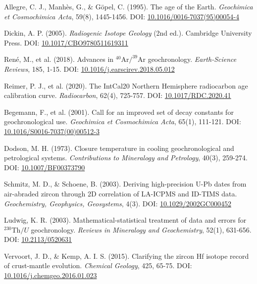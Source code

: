 \documentclass{article}
\begin{document}
\begin{thebibliography}{9}
Allegre, C. J., Manhès, G., \& Göpel, C. (1995). The age of the Earth. \textit{Geochimica et Cosmochimica Acta}, 59(8), 1445-1456. 
DOI: \href{https://doi.org/10.1016/0016-7037(95)00054-4}{10.1016/0016-7037(95)00054-4}

Dickin, A. P. (2005). \textit{Radiogenic Isotope Geology} (2nd ed.). Cambridge University Press. 
DOI: \href{https://doi.org/10.1017/CBO9780511619311}{10.1017/CBO9780511619311}

René, M., et al. (2018). Advances in \(^{40}\text{Ar}/^{39}\text{Ar}\) geochronology. \textit{Earth-Science Reviews}, 185, 1-15. 
DOI: \href{https://doi.org/10.1016/j.earscirev.2018.05.012}{10.1016/j.earscirev.2018.05.012}

Reimer, P. J., et al. (2020). The IntCal20 Northern Hemisphere radiocarbon age calibration curve. \textit{Radiocarbon}, 62(4), 725-757. 
DOI: \href{https://doi.org/10.1017/RDC.2020.41}{10.1017/RDC.2020.41}


Begemann, F., et al. (2001). Call for an improved set of decay constants for geochronological use. \textit{Geochimica et Cosmochimica Acta}, 65(1), 111-121. 
DOI: \href{https://doi.org/10.1016/S0016-7037(00)00512-3}{10.1016/S0016-7037(00)00512-3}

Dodson, M. H. (1973). Closure temperature in cooling geochronological and petrological systems. \textit{Contributions to Mineralogy and Petrology}, 40(3), 259-274.
DOI: \href{https://doi.org/10.1007/BF00373790}{10.1007/BF00373790}

Schmitz, M. D., \& Schoene, B. (2003). Deriving high-precision U-Pb dates from air-abraded zircon through 2D correlation of LA-ICPMS and ID-TIMS data. \textit{Geochemistry, Geophysics, Geosystems}, 4(3). 
DOI: \href{https://doi.org/10.1029/2002GC000452}{10.1029/2002GC000452}

Ludwig, K. R. (2003). Mathematical-statistical treatment of data and errors for \(^{230}\text{Th}/U\) geochronology. \textit{Reviews in Mineralogy and Geochemistry}, 52(1), 631-656.
DOI: \href{https://doi.org/10.2113/0520631}{10.2113/0520631}

Vervoort, J. D., \& Kemp, A. I. S. (2015). Clarifying the zircon Hf isotope record of crust-mantle evolution. \textit{Chemical Geology}, 425, 65-75.  
DOI: \href{https://doi.org/10.1016/j.chemgeo.2016.01.023}{10.1016/j.chemgeo.2016.01.023}


\end{thebibliography}
\end{document}
